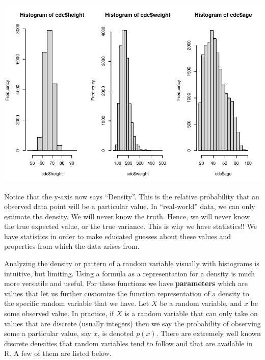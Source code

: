 \documentclass[
]{book}
\newenvironment{Shaded}{\begin{snugshade}}{\end{snugshade}}
\newcommand{\DataTypeTok}[1]{\textcolor[rgb]{0.13,0.29,0.53}{#1}}
\newcommand{\DecValTok}[1]{\textcolor[rgb]{0.00,0.00,0.81}{#1}}
\newcommand{\FloatTok}[1]{\textcolor[rgb]{0.00,0.00,0.81}{#1}}
\newcommand{\KeywordTok}[1]{\textcolor[rgb]{0.13,0.29,0.53}{\textbf{#1}}}
\newcommand{\NormalTok}[1]{#1}
\newcommand{\OperatorTok}[1]{\textcolor[rgb]{0.81,0.36,0.00}{\textbf{#1}}}
\newcommand{\OtherTok}[1]{\textcolor[rgb]{0.56,0.35,0.01}{#1}}
\newcommand{\StringTok}[1]{\textcolor[rgb]{0.31,0.60,0.02}{#1}}
\begin{document}
\begin{Shaded}
\end{Shaded}

\includegraphics{_main_files/figure-latex/unnamed-chunk-216-1.pdf}

Notice that the y-axis now says ``Density''. This is the relative probability that an observed data point will be a particular value. In ``real-world'' data, we can only estimate the density. We will never know the truth. Hence, we will never know the true expected value, or the true variance. This is why we have statistics!! We have statistics in order to make educated guesses about these values and properties from which the data arises from.

Analyzing the density or pattern of a random variable visually with histograms is intuitive, but limiting. Using a formula as a representation for a density is much more versatile and useful. For these functions we have \textbf{parameters} which are values that let us further customize the function representation of a density to the specific random variable that we have. Let \(X\) be a random variable, and \(x\) be some observed value. In practice, if \(X\) is a random variable that can only take on values that are discrete (usually integers) then we say the probability of observing some a particular value, say \(x\), is denoted \(p(x)\). There are extremely well known discrete densities that random variables tend to follow and that are available in R. A few of them are listed below.
\end{document}
